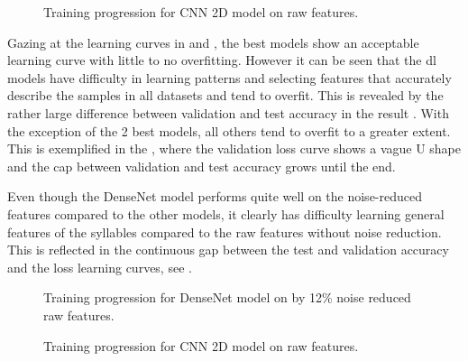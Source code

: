 \begin{figure}[ht!]
\centering
  \hfill
  \caption{Training progression for CNN 2D model \cite{nn_cnn_2d_sct_compressed_nrs0_raw_100} on raw features.}
  \label{fig:train_val_cnn_2d_sct_compressed_nrs0_raw_100}
\end{figure}

Gazing at the learning curves in  and , the best models show an acceptable learning curve with little to no overfitting.
However it can be seen that the \gls{dl} models have difficulty in learning patterns and selecting features that accurately describe the samples in all datasets and tend to overfit. This is revealed by the rather large difference between validation and test accuracy in the result .
With the exception of the 2 best models, all others tend to overfit to a greater extent.
This is exemplified in the , where the validation loss curve shows a vague U shape and the cap between validation and test accuracy grows until the end.

Even though the DenseNet model performs quite well on the noise-reduced features compared to the other models, it clearly has difficulty learning general features of the syllables compared to the raw features without noise reduction.
This is reflected in the continuous gap between the test and validation accuracy and the loss learning curves, see .

\begin{figure}[ht!]
\centering
  \hfill
  \caption{Training progression for DenseNet model \cite{nn_densNet_sct_compressed_nrs12_raw_100} on by  12\% noise reduced raw features.}
  \label{fig:train_val_densNet_sct_compressed_nrs12_raw_100}
\end{figure}

\begin{figure}[ht!]
\centering
  \hfill
  \caption{Training progression for CNN 2D model \cite{nn_lstm_sct_compressed_nrs0_hog_100} on raw features.}
  \label{fig:train_val_lstm_sct_compressed_nrs0_hog_100}
\end{figure}

